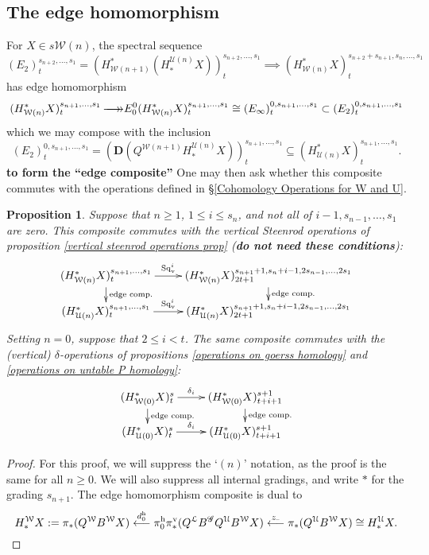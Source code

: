 \documentclass[11pt]{amsart}
\theoremstyle{plain}
\newtheorem{prop}[thm]{Proposition}
\theoremstyle{definition}
\newcommand{\DASH}{\textup{--}}
\renewcommand{\to}{\longrightarrow}
\newcommand{\from}{\longleftarrow}
\newcommand{\scrG}{\mathscr{G}}
\newcommand{\calU}{\mathcal{U}}
\newcommand{\calL}{\mathcal{L}}
\newcommand{\calw}{\mathcal{W}}
\theoremstyle{plain}
\newcommand{\BSW}{{\scrG}}
\newcommand{\epi}{{\,\makebox[0cm][l]{\ensuremath\to}\to}}
\newcommand{\Sqv}{\mathrm{Sq}_\textup{v}}
\newcommand{\dual}{\mathbf{D}}
\begin{document}
\begin{Composite functor spectral sequences}
\subsection{The edge homomorphism}
For $X\in s\calw(n)$, the spectral sequence
\[(E_2)^{s_{n+2},\ldots,s_1}_t=(H^*_{\calw(n+1)}(H_*^{\calU(n)}X))^{s_{n+2},\ldots,s_1}_t\implies (H^*_{\calw(n)}X)^{s_{n+2}+s_{n+1},s_n,\ldots,s_1}_t\]
has edge homomorphism
\[(H^*_{\calw(n)}X)^{s_{n+1},\ldots,s_{1}}_t\epi
E_0^{0}(H^*_{\calw(n)}X)^{s_{n+1},\ldots,s_{1}}_t\cong (E_\infty)^{0,s_{n+1},\ldots,s_1}_t\subset (E_2)^{0,s_{n+1},\ldots,s_1}_t\]
which we may compose with the inclusion
\[(E_2)^{0,s_{n+1},\ldots,s_1}_t=(\dual(Q^{\calw(n+1)}H_*^{\calU(n)}X))^{s_{n+1},\ldots,s_1}_t\subseteq (H^*_{\calU(n)}X)^{s_{n+1},\ldots,s_1}_t.\]
\textbf{to form the ``edge composite''}
One may then ask whether this composite commutes with the operations defined in \S\ref{Cohomology Operations for W and U}.
\begin{prop}\label{edgehomproposition}
Suppose that $n\geq1$, $1\leq i \leq s_n$, and not all of $i-1,s_{n-1},\ldots,s_1$ are zero. This composite commutes with the vertical Steenrod operations of proposition \ref{vertical steenrod operations prop} (\textbf{do not need these conditions}):
\[\xymatrix@R=4mm{
(H^*_{\calw(n)}X)^{s_{n+1},\ldots,s_1}_t\ar[r]^-{\Sqv^i}
\ar[d]^-{\textup{edge comp.}}
&%
(H^*_{\calw(n)}X)^{s_{n+1}+1,s_n+i-1,2s_{n-1},\ldots,2s_1}_{2t+1}\ar[d]^-{\textup{edge comp.}}
\\%
(H^*_{\calU(n)}X)^{s_{n+1},\ldots,s_1}_t\ar[r]^-{\Sqv^i}
&%
(H^*_{\calU(n)}X)^{s_{n+1}+1,s_n+i-1,2s_{n-1},\ldots,2s_1}_{2t+1}
}\]
Setting $n=0$, suppose that $2\leq i <t$. The same composite commutes with the (vertical) $\delta$-operations of propositions \ref{operations on goerss homology} and \ref{operations on untable P homology}:
\[\xymatrix@R=4mm{
(H^*_{\calw(0)}X)^{s}_t\ar[r]^-{\delta_i}
\ar[d]^-{\textup{edge comp.}}
&%
(H^*_{\calw(0)}X)^{s+1}_{t+i+1}\ar[d]^-{\textup{edge comp.}}
\\%
(H^*_{\calU(0)}X)^{s}_t\ar[r]^-{\delta_i}
&%
(H^*_{\calU(0)}X)^{s+1}_{t+i+1}
}\]
\end{prop}
\begin{proof}For this proof, we will suppress the `$(n)$' notation, as the proof is the same for all $n\geq0$. We will also suppress all internal gradings, and write $*$ for the grading $s_{n+1}$. The edge homomorphism composite is dual to
\[H_*^{\calw}X:=\pi_*(Q^{\calw}B^{\calw}X)\overset{d_0^\textup{h}}{\from}\pi_0^\textup{h}\pi_*^\textup{v}(Q^{\calL}B^{\BSW} Q^{\calU}B^{\calw}X)\overset{z_{\DASH}}{\from}\pi_*(Q^{\calU}B^{\calw}X)\cong H_*^{\calU}X.\]

\end{proof}
\end{Composite functor spectral sequences}
\end{document}
